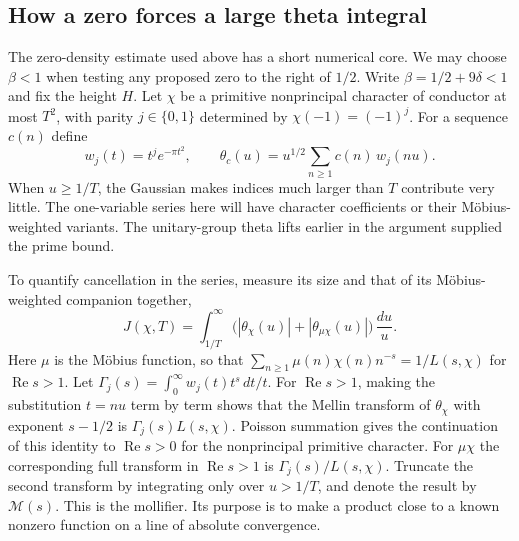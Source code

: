 \documentclass[11pt,letterpaper]{article}
\renewcommand{\Re}{\operatorname{Re}}
\begin{document}
\subsection{How a zero forces a large theta integral}
\label{sec:bad-twists-detail}

The zero-density estimate used above has a short numerical core. We may choose \(\beta<1\) when testing any proposed zero to the right of \(1/2\). Write \(\beta=1/2+9\delta<1\) and fix the height \(H\). Let \(\chi\) be a primitive nonprincipal character of conductor at most \(T^2\), with parity \(j\in\{0,1\}\) determined by \(\chi(-1)=(-1)^j\). For a sequence \(c(n)\) define
\[
  w_j(t)=t^j e^{-\pi t^2},\qquad
  \theta_c(u)=u^{1/2}\sum_{n\ge1} c(n)\,w_j(nu).
\]
When \(u\ge1/T\), the Gaussian makes indices much larger than \(T\) contribute very little. The one-variable series here will have character coefficients or their Möbius-weighted variants. The unitary-group theta lifts earlier in the argument supplied the prime bound.

To quantify cancellation in the series, measure its size and that of its Möbius-weighted companion together,
\[
   J(\chi,T)=\int_{1/T}^{\infty}
    \bigl(|\theta_\chi(u)|+|\theta_{\mu\chi}(u)|\bigr)\,\frac{du}{u}.
\]
Here \(\mu\) is the Möbius function, so that \(\sum_{n\ge1}\mu(n)\chi(n)n^{-s}=1/L(s,\chi)\) for \(\Re s>1\). Let \(\Gamma_j(s)=\int_0^\infty w_j(t)t^s\,dt/t\). For \(\Re s>1\), making the substitution \(t=nu\) term by term shows that the Mellin transform of \(\theta_\chi\) with exponent \(s-1/2\) is \(\Gamma_j(s)L(s,\chi)\). Poisson summation gives the continuation of this identity to \(\Re s>0\) for the nonprincipal primitive character. For \(\mu\chi\) the corresponding full transform in \(\Re s>1\) is \(\Gamma_j(s)/L(s,\chi)\). Truncate the second transform by integrating only over \(u>1/T\), and denote the result by \(\mathcal M(s)\). This is the mollifier. Its purpose is to make a product close to a known nonzero function on a line of absolute convergence.
\end{document}
